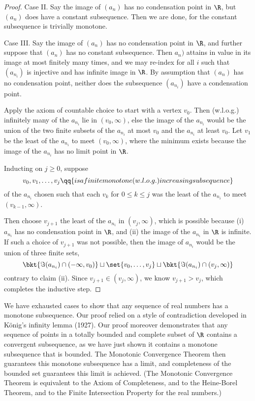 \documentclass[onesided]{ccg-pset}
\begin{document}
\begin{enumerate}
\begin{proof}
    Case II. Say the image of $(a_n)$ has no condensation point in $\R$, but $(a_n)$ does have a constant subsequence. Then we are done, for the constant subsequence is trivially monotone.

    \newpage
    Case III. Say the image of $(a_n)$ has no condensation point in $\R$, and further suppose that $(a_n)$ has no constant subsequence. Then $a_n)$ attains in value in its image at most finitely many times, and we may re-index for all $i$ such that $(a_{n_i})$ is injective and has infinite image in $\R$. By assumption that $(a_n)$ has no condensation point, neither does the subsequence $(a_{n_i})$ have a condensation point.

    Apply the axiom of countable choice to start with a vertex $v_0$. Then (w.l.o.g.) infinitely many of the $a_{n_i}$ lie in $(v_0, \infty)$, else the image of the $a_{n_i}$ would be the union of the two finite subsets of the $a_{n_i}$ at most $v_0$ and the $a_{n_i}$ at least $v_0$. Let $v_1$ be the least of the $a_{n_i}$ to meet $(v_0, \infty)$, where the minimum exists because the image of the $a_{n_i}$ has no limit point in $\R$. 

    Inducting on $j \ge 0$, suppose 
    \begin{equation*}
        v_0, v_1, \ldots, v_j \qq{is a finite monotone (w.l.o.g.) increasing subsequence}
    \end{equation*}
     of the $a_{n_i}$ chosen such that each $v_k$ for $0 \le k \le j$ was the least of the $a_{n_i}$ to meet $(v_{k-1}, \infty)$. 

    Then choose $v_{j+1}$ the least of the $a_{n_i}$ in $(v_j, \infty)$, which is possible because (i) $a_{n_i}$ has no condensation point in $\R$, and (ii) the image of the $a_{n_i}$ in $\R$ is infinite. If such a choice of $v_{j+1}$ was not possible, then the image of $a_{n_i}$ would be the union of three finite sets, 
    \begin{equation*}
        \bkt{\Im (a_{n_i}) \cap (-\infty, v_0)} \sqcup \set{v_0, \ldots, v_j} \sqcup \bkt{\Im (a_{n_i}) \cap (v_j, \infty)}
    \end{equation*}
    contrary to claim (ii). Since $v_{j+1} \in (v_j, \infty)$, we know $v_{j+1} > v_j$, which completes the inductive step.
\end{proof}
    \begin{note}[]
        We have exhausted cases to show that any sequence of real numbers has a monotone subsequence. Our proof relied on a style of contradiction developed in K\"onig's infinity lemma (1927). Our proof moreover demonstrates that any sequence of points in a totally bounded and complete subset of $\R$ contains a convergent subsequence, as we have just shown it contains a monotone subsequence that is bounded. The Monotonic Convergence Theorem then guarantees this monotone subsequence has a limit, and completeness of the bounded set guarantees this limit is achieved. (The Monotonic Convergence Theorem is equivalent to the Axiom of Completeness, and to the Heine-Borel Theorem, and to the Finite Intersection Property for the real numbers.)
    \end{note}


\end{enumerate}
\end{document}
